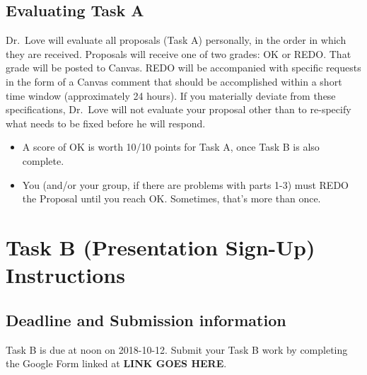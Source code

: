 \documentclass[]{book}
\providecommand{\tightlist}{%
  \setlength{\itemsep}{0pt}\setlength{\parskip}{0pt}}
\theoremstyle{definition}
\theoremstyle{definition}
\theoremstyle{definition}
\theoremstyle{remark}
\begin{document}
\hypertarget{evaluating-task-a}{%
\section{Evaluating Task A}\label{evaluating-task-a}}

Dr.~Love will evaluate all proposals (Task A) personally, in the order
in which they are received. Proposals will receive one of two grades: OK
or REDO. That grade will be posted to Canvas. REDO will be accompanied
with specific requests in the form of a Canvas comment that should be
accomplished within a short time window (approximately 24 hours). If you
materially deviate from these specifications, Dr.~Love will not evaluate
your proposal other than to re-specify what needs to be fixed before he
will respond.

\begin{itemize}
\tightlist
\item
  A score of OK is worth 10/10 points for Task A, once Task B is also
  complete.
\item
  You (and/or your group, if there are problems with parts 1-3) must
  REDO the Proposal until you reach OK. Sometimes, that's more than
  once.
\end{itemize}

\hypertarget{taskB}{%
\chapter{Task B (Presentation Sign-Up) Instructions}\label{taskB}}

\hypertarget{deadline-and-submission-information-1}{%
\section{Deadline and Submission
information}\label{deadline-and-submission-information-1}}

Task B is due at noon on 2018-10-12. Submit your Task B work by
completing the Google Form linked at \textbf{LINK GOES HERE}.
\end{document}
